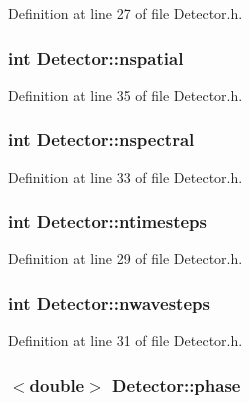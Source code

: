Definition at line 27 of file Detector.h.

\hypertarget{classDetector_ad0d59d1328b59ce6c13f49361b50ac29}{
\subsubsection[{nspatial}]{\setlength{\rightskip}{0pt plus 5cm}int {\bf Detector::nspatial}}}
\label{classDetector_ad0d59d1328b59ce6c13f49361b50ac29}


Definition at line 35 of file Detector.h.

\hypertarget{classDetector_a83edf838e8d00d2286e2e75f54836601}{
\subsubsection[{nspectral}]{\setlength{\rightskip}{0pt plus 5cm}int {\bf Detector::nspectral}}}
\label{classDetector_a83edf838e8d00d2286e2e75f54836601}


Definition at line 33 of file Detector.h.

\hypertarget{classDetector_ada81397b9b56b728a7a6d20b48d40e2d}{
\subsubsection[{ntimesteps}]{\setlength{\rightskip}{0pt plus 5cm}int {\bf Detector::ntimesteps}}}
\label{classDetector_ada81397b9b56b728a7a6d20b48d40e2d}


Definition at line 29 of file Detector.h.

\hypertarget{classDetector_aa5e5de28e589cc3cee8ee535ba03d34a}{
\subsubsection[{nwavesteps}]{\setlength{\rightskip}{0pt plus 5cm}int {\bf Detector::nwavesteps}}}
\label{classDetector_aa5e5de28e589cc3cee8ee535ba03d34a}


Definition at line 31 of file Detector.h.

\hypertarget{classDetector_a434d34a6f28382fff13111fbb8c1b6a9}{
\subsubsection[{phase}]{$<$double$>$ {\bf Detector::phase}}}
\label{classDetector_a434d34a6f28382fff13111fbb8c1b6a9}


